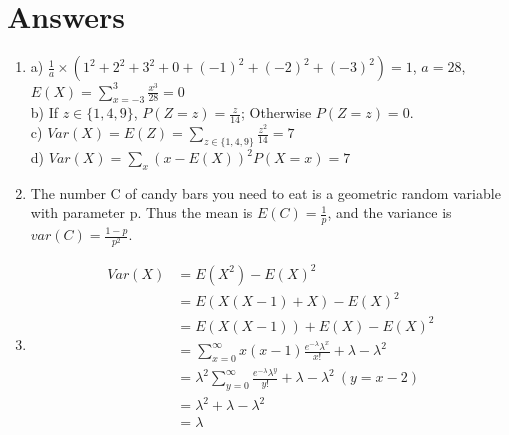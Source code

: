 \documentclass[11pt]{article}
\begin{document}
\section{Answers}
\begin{enumerate}
  \item a) $\frac{1}{a} \times (1^2+2^2+3^2 + 0 + (-1)^2+(-2)^2+(-3)^2) = 1$, $a = 28$, $E(X) = \sum_{x=-3}^{3} \frac{x^3}{28} = 0$
  \\ b) If $z \in \{1,4,9\}$, $P(Z=z) = \frac{z}{14}$; Otherwise $P(Z=z) = 0$.
  \\ c) $Var(X) = E(Z) = \sum_{z \in \{1,4,9\}} \frac{z^2}{14} = 7$
  \\ d) $Var(X) = \sum_{x} (x - E(X))^2P(X=x) = 7$
  \item The number C of candy bars you need to eat is a geometric random variable with parameter p. Thus the mean is $E(C) = \frac{1}{p}$, and the variance is $var(C) = \frac{1-p}{p^2}$.
  \item 
  \begin{align*}
    Var(X) &= E(X^2) - E(X)^2 
    \\ &= E(X(X-1) + X) - E(X)^2 
    \\ &= E(X(X-1)) + E(X) - E(X)^2 
    \\ &= \sum_{x=0}^{\infty} x(x-1)\frac{e^{-\lambda} \lambda^x}{x!} + \lambda - \lambda^2
    \\ &= \lambda^2 \sum_{y=0}^{\infty} \frac{e^{-\lambda} \lambda^y}{y!} + \lambda - \lambda^2 \: (y = x - 2)
    \\ &= \lambda^2 + \lambda - \lambda^2
    \\ &= \lambda 
  \end{align*}
\end{enumerate}
\end{document}

